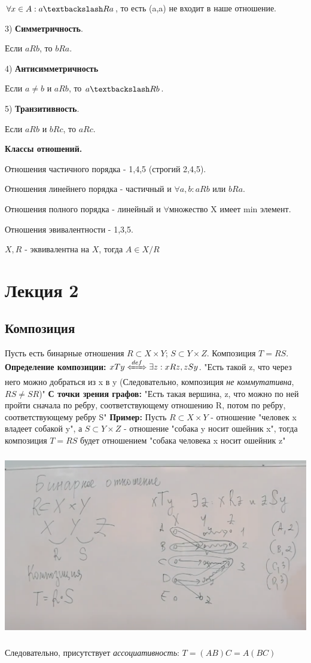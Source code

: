 \documentclass{article}
\newcommand{\defLeftrightarrow}{\xLeftrightarrow{def}}
\begin{document}
$\forall x \in A: a\textbackslash Ra$, то есть (a,a) не входит в наше отношение.

3) \textbf{Симметричность}.

Если $aRb$, то $bRa$.

4) \textbf{Антисимметричность} 

Если $a\neq b$ и $aRb$, то $a\textbackslash Rb$.

5) \textbf{Транзитивность}.

Если $aRb$ и $bRc$, то $aRc$.

\textbf{Классы отношений.}

Отношения частичного порядка - 1,4,5 (строгий 2,4,5).

Отношения линейнего порядка - частичный и $\forall a,b: aRb$ или $bRa$.

Отношения полного порядка - линейный и $\forall $множество X имеет min элемент.

Отношения эвивалентности - 1,3,5.

$X,R$ - эквивалентна на $X$, тогда $A\in X /R$

\section{Лекция 2}
\subsection{Композиция}
Пусть есть бинарные отношения $ R \subset X \times Y $; $ S \subset Y \times Z $.
Композиция $T = RS$. 
\textbf{Определение композиции:} 
$ xTy \defLeftrightarrow \exists z : xRz, zSy$.
"Есть такой z, что через него можно добраться из x в y (Следовательно, композиция \textit{не коммутативна}, $ RS \neq SR $)"
\textbf{С точки зрения графов:}
"Есть такая вершина, z, что можно по ней пройти сначала по ребру, соответствующему отношению R, потом по ребру, соответствующему ребру S"
\textbf{Пример:} 
Пусть $ R \subset X\times Y$ - отношение "человек x владеет собакой y", а $ S \subset Y\times Z$ - отношение "собака y носит ошейник x", тогда композиция $T=RS$ будет отношением "собака человека x носит ошейник z"
\begin{center}
  \includegraphics[height=8cm]{2-1-1.png}
\end{center}
Следовательно, присутствует \textit{ассоциативность}: $ T = (AB)C = A(BC) $
\end{document}
